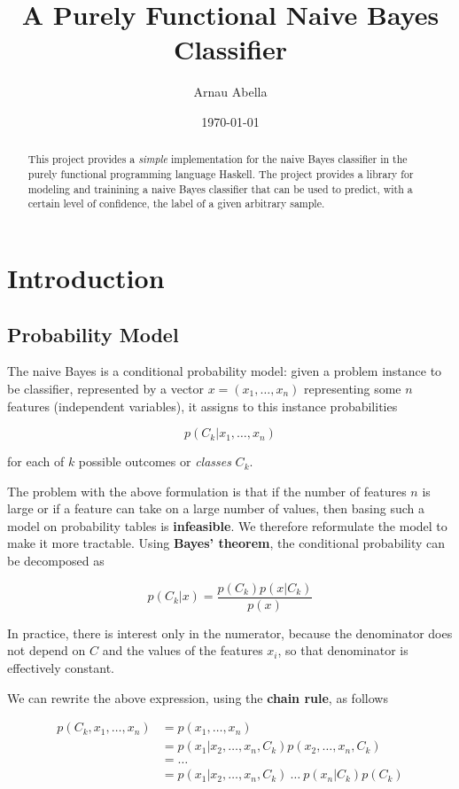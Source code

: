 \documentclass[12pt, a4paper]{article}
\title{A Purely Functional Naive Bayes Classifier}
\author{Arnau Abella}
\date{\today}
\begin{document}
\maketitle

\begin{abstract}
\noindent
  This project provides a \textit{simple} implementation for the naive Bayes classifier in the purely functional programming language Haskell.
  The project provides a library for modeling and trainining a naive Bayes classifier that can be used to predict, with a certain level of confidence, the label of a given arbitrary sample.
\end{abstract}


\section{Introduction} \label{introduction}

\subsection{Probability Model} \label{probability-model}

The naive Bayes is a conditional probability model: given a problem instance to be classifier, represented by a vector $x = (x_1, \dots , x_n)$ representing some $n$ features (independent variables), it assigns to this instance probabilities

\[
  p(C_k | x_1, \dots , x_n)
\]

for each of $k$ possible outcomes or \textit{classes} $C_k$.

The problem with the above formulation is that if the number of features $n$ is large or if a feature can take on a large number of values, then basing such a model on probability tables is \textbf{infeasible}. We therefore reformulate the model to make it more tractable. Using \textbf{Bayes' theorem}, the conditional probability can be decomposed as

\[
  p(C_k | x) = \frac{p(C_k)p(x|C_k)}{p(x)}
\]

In practice, there is interest only in the numerator, because the denominator does not depend on $C$ and the values of the features $x_i$, so that denominator is effectively constant.

We can rewrite the above expression, using the \textbf{chain rule}, as follows

\begin{align*}
  p(C_k, x_1, \dots , x_n) &= p(x_1, \dots, x_n) \\
                           &= p(x_1 | x_2, \dots , x_n, C_k)p(x_2, \dots , x_n, C_k) \\
                           &= \dots \\
                           &= p(x_1 | x_2, \dots , x_n, C_k) \ \dots \ p(x_n | C_k) p(C_k)
\end{align*}
\end{document}
